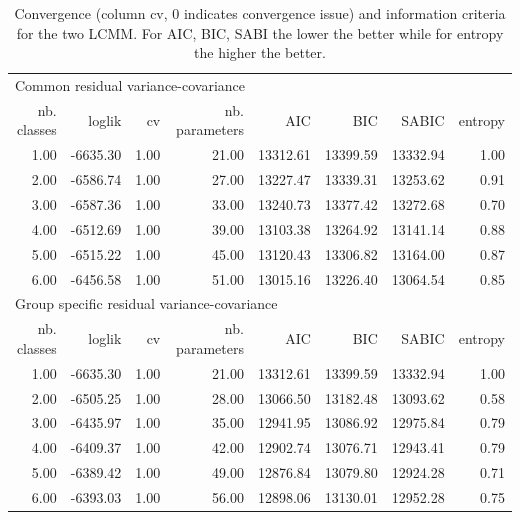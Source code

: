 \documentclass[12pt]{article}
\begin{document}
\begin{table}[!h]
\centering
\begin{tabular}{rrrrrrrr}
  \hline
\multicolumn{8}{l}{Common residual variance-covariance}  \\ 
nb. classes & loglik & cv & nb. parameters & AIC & BIC & SABIC & entropy \\ 
  \hline
1.00 & -6635.30 & 1.00 & 21.00 & 13312.61 & 13399.59 & 13332.94 & 1.00 \\ 
  2.00 & -6586.74 & 1.00 & 27.00 & 13227.47 & 13339.31 & 13253.62 & 0.91 \\ 
  3.00 & -6587.36 & 1.00 & 33.00 & 13240.73 & 13377.42 & 13272.68 & 0.70 \\ 
  4.00 & -6512.69 & 1.00 & 39.00 & 13103.38 & 13264.92 & 13141.14 & 0.88 \\ 
  5.00 & -6515.22 & 1.00 & 45.00 & 13120.43 & 13306.82 & 13164.00 & 0.87 \\ 
  6.00 & -6456.58 & 1.00 & 51.00 & 13015.16 & 13226.40 & 13064.54 & 0.85 \\ 
\hline 
  \hline
\multicolumn{8}{l}{Group specific residual variance-covariance}  \\ 
nb. classes & loglik & cv & nb. parameters & AIC & BIC & SABIC & entropy \\ 
  \hline
1.00 & -6635.30 & 1.00 & 21.00 & 13312.61 & 13399.59 & 13332.94 & 1.00 \\ 
  2.00 & -6505.25 & 1.00 & 28.00 & 13066.50 & 13182.48 & 13093.62 & 0.58 \\ 
  3.00 & -6435.97 & 1.00 & 35.00 & 12941.95 & 13086.92 & 12975.84 & 0.79 \\ 
  4.00 & -6409.37 & 1.00 & 42.00 & 12902.74 & 13076.71 & 12943.41 & 0.79 \\ 
  5.00 & -6389.42 & 1.00 & 49.00 & 12876.84 & 13079.80 & 12924.28 & 0.71 \\ 
  6.00 & -6393.03 & 1.00 & 56.00 & 12898.06 & 13130.01 & 12952.28 & 0.75 \\ 
   \hline
\end{tabular}
\caption{Convergence (column cv, 0 indicates convergence issue) and information criteria for the two LCMM. For AIC, BIC, SABI the lower the better while for entropy the higher the better.}
\label{tab:lcmm}
\end{table}
\end{document}

